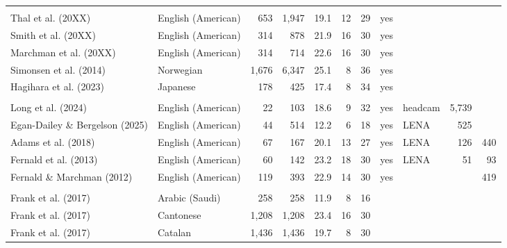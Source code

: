 \documentclass[
  11pt,
]{article}
\begin{document}
\begin{landscape}
\begin{longtable}[t]{llrrrrrclrr}
\endfoot
\bottomrule
\endlastfoot
\addlinespace[0.3em]
\multicolumn{11}{l}{\textbf{Wordbank longitudinal}}\\
\hspace{1em}Thal et al. (20XX) & English (American) & 653 & 1,947 & 19.1 & 12 & 29 & yes &  &  & \\
\hspace{1em}Smith et al. (20XX) & English (American) & 314 & 878 & 21.9 & 16 & 30 & yes &  &  & \\
\hspace{1em}Marchman et al. (20XX) & English (American) & 314 & 714 & 22.6 & 16 & 30 & yes &  &  & \\
\hspace{1em}Simonsen et al. (2014) & Norwegian & 1,676 & 6,347 & 25.1 & 8 & 36 & yes &  &  & \\
\hspace{1em}Hagihara et al. (2023) & Japanese & 178 & 425 & 17.4 & 8 & 34 & yes &  &  & \\
\addlinespace[0.3em]
\multicolumn{11}{l}{\textbf{Input / processing}}\\
\hspace{1em}Long et al. (2024) & English (American) & 22 & 103 & 18.6 & 9 & 32 & yes & headcam & 5,739 & \\
\hspace{1em}Egan-Dailey \& Bergelson (2025) & English (American) & 44 & 514 & 12.2 & 6 & 18 & yes & LENA & 525 & \\
\hspace{1em}Adams et al. (2018) & English (American) & 67 & 167 & 20.1 & 13 & 27 & yes & LENA & 126 & 440\\
\hspace{1em}Fernald et al. (2013) & English (American) & 60 & 142 & 23.2 & 18 & 30 & yes & LENA & 51 & 93\\
\hspace{1em}Fernald \& Marchman (2012) & English (American) & 119 & 393 & 22.9 & 14 & 30 & yes &  &  & 419\\
\addlinespace[0.3em]
\multicolumn{11}{l}{\textbf{Wordbank cross-sectional}}\\
\hspace{1em}Frank et al. (2017) & Arabic (Saudi) & 258 & 258 & 11.9 & 8 & 16 &  &  &  & \\
\hspace{1em}Frank et al. (2017) & Cantonese & 1,208 & 1,208 & 23.4 & 16 & 30 &  &  &  & \\
\hspace{1em}Frank et al. (2017) & Catalan & 1,436 & 1,436 & 19.7 & 8 & 30 &  &  &  & \\

\end{longtable}
\end{landscape}
\end{document}
